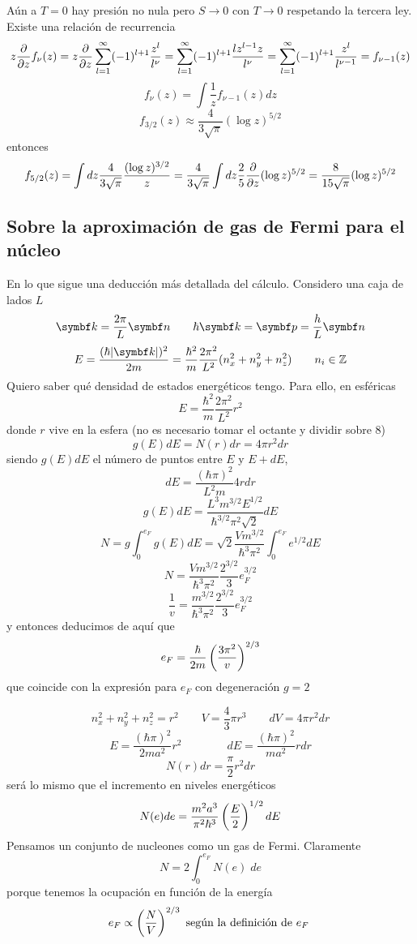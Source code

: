 \documentclass[10pt,oneside]{CBFT_book}
\begin{document}
Aún a $T=0$ hay presión no nula pero $S \to 0$ con $T \to 0$ respetando la tercera ley.
Existe una relación de recurrencia
\[
	z\frac{\partial^{\hspace{-0.05em}} {}}{\partial {z}^{\hspace{-0.05em}}} f_\nu(z) = z\frac{\partial^{\hspace{-0.05em}} {}}{\partial {z}^{\hspace{-0.05em}}} \sum_{l=1}^\infty (-1)^{l+1} \frac{z^l}{l^\nu} =
	\sum_{l=1}^\infty (-1)^{l+1} \frac{l z^{l-1} z}{l^\nu} = 
	\sum_{l=1}^\infty (-1)^{l+1} \frac{z^l}{l^{\nu-1}} = f_{\nu-1}(z)
\]
\[
	f_\nu(z) = \int \frac{1}{z} f_{\nu-1}(z) dz
\]
\[
	f_{3/2}(z) \approx \frac{4}{3\sqrt{\pi}} (\log z)^{5/2}
\]
entonces
\[
	f_{5/2}(z) = \int dz \frac{4}{3\sqrt{\pi}} \frac{(\log z)^{3/2}}{z} =
	 \frac{4}{3\sqrt{\pi}} \int dz \frac{ 2 }{ 5 } \frac{\partial^{\hspace{-0.05em}} {}}{\partial {z}^{\hspace{-0.05em}}} (\log z)^{5/2} =
	\frac{8}{15\sqrt{\pi}}(\log z)^{5/2}
\]

\subsection{Sobre la aproximación de gas de Fermi para el núcleo}

En lo que sigue una deducción más detallada del cálculo.
Considero una caja de lados $L$
\[
	\vb{k} = \frac{2\pi}{L} \vb{n} \qquad \hbar \vb{k} = \vb{p} = \frac{h}{L} \vb{n}
\]
\[
	E = \frac{( \hbar |\vb{k}| )^2}{ 2m } = \frac{ \hbar^2 }{ m } \frac{2\pi^2}{L^2}
	(n_x^2 + n_y^2 + n_z^2) \qquad n_i \in \mathbb{Z}
\]
Quiero saber qué densidad de estados energéticos tengo. Para ello, en esféricas
\[
	E = \frac{ \hbar^2 }{ m } \frac{2\pi^2}{L^2} r^2
\]
donde $r$ vive en la esfera (no es necesario tomar el octante y dividir sobre 8)
\[
	g(E) dE = N(r) dr = 4\pi r^2 dr
\]
siendo $g(E) dE$ el número de puntos entre $E$ y $E+dE$,
\[
	dE = \frac{(\hbar \pi)^2}{L^2 m}4 r dr 
\]
\[
	g(E) dE = \frac{ L^3 m^{3/2} E^{1/2} }{ \hbar^{3/2} \pi^2  \sqrt{2}}dE
\]
\[
	N = g\int_0^{e_F} g(E) dE = \sqrt{2} \frac{ V m^{3/2} }{ \hbar^3 \pi^2 } 
	\int_0^{e_F} e^{1/2} dE
\]
\[
	N = \frac{ V m^{3/2} }{ \hbar^3 \pi^2 } \frac{2^{3/2}}{3} e_F^{3/2}
\]
\[
	\frac{1}{v} = \frac{ m^{3/2} }{ \hbar^3 \pi^2 } \frac{2^{3/2}}{3} e_F^{3/2}
\]
y entonces deducimos de aquí que 
\[
	e_F = \frac{\hbar}{2m} \left( \frac{ 3\pi^2 }{ v } \right)^{2/3}
\]
que coincide con la expresión para $e_F$ con degeneración $g=2$

\[
	n_x^2 + n_y^2 + n_z^2 = r^2 \qquad V=\frac{4}{3}\pi r^3 \qquad dV = 4\pi r^2 dr
\]
\[
	E = \frac{(\hbar \pi)^2}{2ma^2}r^2 \qquad \qquad dE = \frac{(\hbar \pi)^2}{ma^2}r dr
\]
\[
	N(r) dr = \frac{\pi}{2} r^2 dr 
\]
será lo mismo que el incremento en niveles energéticos
\[
	N(e)de = \frac{m^2 a^3}{\pi^2 \hbar^3} \left( \frac{ E }{ 2 } \right)^{1/2} dE
\]
Pensamos un conjunto de nucleones como un gas de Fermi. 
Claramente
\[
	N = 2 \int_0^{e_F} N(e) \; de
\]
porque tenemos la ocupación en función de la energía
\[
	e_F \propto \left( \frac{ N }{ V } \right)^{2/3} \text{ según la definición de $e_F$ }
\]
\end{document}
